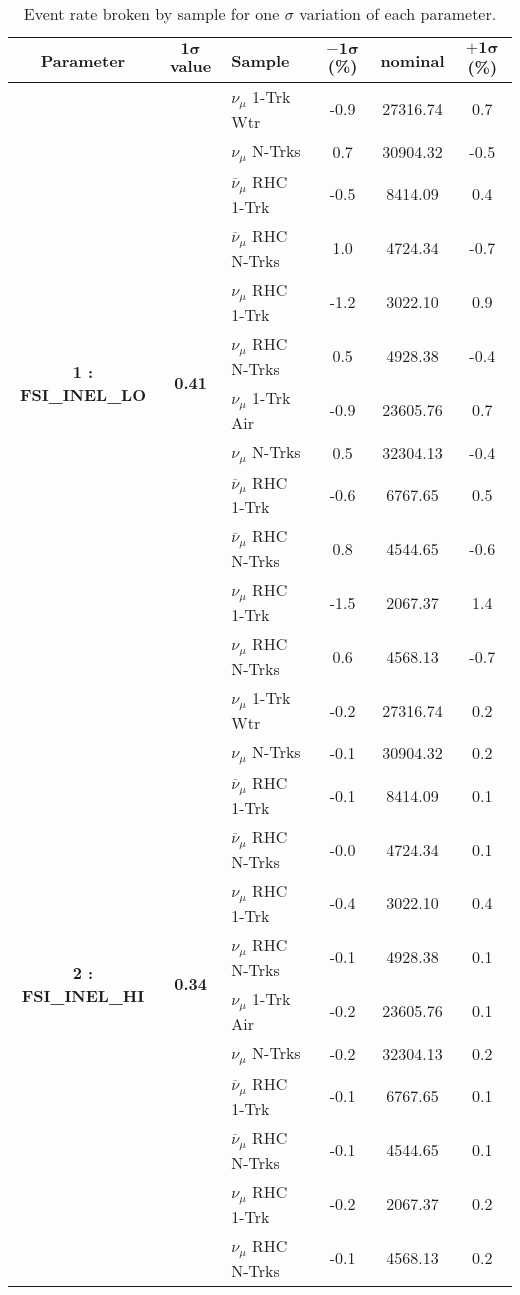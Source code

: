 \begin{table}[ht!]
\centering
\begin{tabular}{ c  c  l  c  c  c }
\midrule[1.3pt]
\textbf{Parameter} & \textbf{$\mathbf{1\sigma}$ value} & \textbf{Sample} & \textbf{$\mathbf{-1\sigma}$ (\%)}  &  \textbf{nominal}  &  \textbf{$\mathbf{+1\sigma}$ (\%)} \\
\midrule[1.3pt]
\multirow{12}{*}{\textbf{1 : FSI\_INEL\_LO}} & \multirow{12}{*}{\textbf{0.41}} & $\nu_\mu$ 1-Trk Wtr &   -0.9 &  27316.74 &   0.7 \\ 
 &  & $\nu_\mu$ N-Trks &   0.7 &  30904.32 &   -0.5 \\ 
 &  & $\overline{\nu}_\mu$ RHC 1-Trk &   -0.5 &  8414.09 &   0.4 \\ 
 &  & $\overline{\nu}_\mu$ RHC N-Trks &   1.0 &  4724.34 &   -0.7 \\ 
 &  & $\nu_\mu$ RHC 1-Trk &   -1.2 &  3022.10 &   0.9 \\ 
 &  & $\nu_\mu$ RHC N-Trks &   0.5 &  4928.38 &   -0.4 \\ 
 &  & $\nu_\mu$ 1-Trk Air &   -0.9 &  23605.76 &   0.7 \\ 
 &  & $\nu_\mu$ N-Trks &   0.5 &  32304.13 &   -0.4 \\ 
 &  & $\overline{\nu}_\mu$ RHC 1-Trk &   -0.6 &  6767.65 &   0.5 \\ 
 &  & $\overline{\nu}_\mu$ RHC N-Trks &   0.8 &  4544.65 &   -0.6 \\ 
 &  & $\nu_\mu$ RHC 1-Trk &   -1.5 &  2067.37 &   1.4 \\ 
 &  & $\nu_\mu$ RHC N-Trks &   0.6 &  4568.13 &   -0.7 \\ 
\midrule[1.3pt]
\multirow{12}{*}{\textbf{2 : FSI\_INEL\_HI}} & \multirow{12}{*}{\textbf{0.34}} & $\nu_\mu$ 1-Trk Wtr &   -0.2 &  27316.74 &   0.2 \\ 
 &  & $\nu_\mu$ N-Trks &   -0.1 &  30904.32 &   0.2 \\ 
 &  & $\overline{\nu}_\mu$ RHC 1-Trk &   -0.1 &  8414.09 &   0.1 \\ 
 &  & $\overline{\nu}_\mu$ RHC N-Trks &   -0.0 &  4724.34 &   0.1 \\ 
 &  & $\nu_\mu$ RHC 1-Trk &   -0.4 &  3022.10 &   0.4 \\ 
 &  & $\nu_\mu$ RHC N-Trks &   -0.1 &  4928.38 &   0.1 \\ 
 &  & $\nu_\mu$ 1-Trk Air &   -0.2 &  23605.76 &   0.1 \\ 
 &  & $\nu_\mu$ N-Trks &   -0.2 &  32304.13 &   0.2 \\ 
 &  & $\overline{\nu}_\mu$ RHC 1-Trk &   -0.1 &  6767.65 &   0.1 \\ 
 &  & $\overline{\nu}_\mu$ RHC N-Trks &   -0.1 &  4544.65 &   0.1 \\ 
 &  & $\nu_\mu$ RHC 1-Trk &   -0.2 &  2067.37 &   0.2 \\ 
 &  & $\nu_\mu$ RHC N-Trks &   -0.1 &  4568.13 &   0.2 \\ 
\midrule[1.3pt]
\end{tabular}
\centering
\caption{Event rate broken by sample for one $\sigma$ variation of each parameter.}
\end{table}
